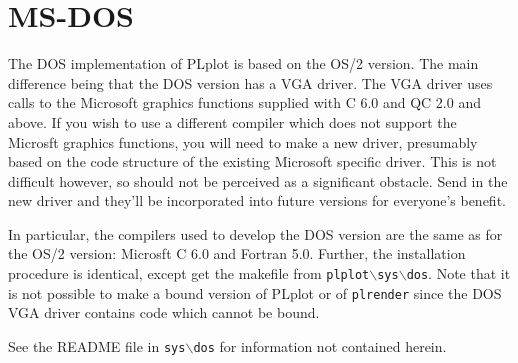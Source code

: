 \section{MS-DOS}

The DOS implementation of PLplot is based on the OS/2 version.  The main 
difference being that the DOS version has a VGA driver.  The VGA driver
uses calls to the Microsoft graphics functions supplied with C 6.0 and
QC 2.0 and above.  If you wish to use a different compiler which does not
support the Microsft graphics functions, you will need to make a new driver,
presumably based on the code structure of the existing Microsoft specific
driver.
This is not difficult however, so should not be perceived as a significant
obstacle.  Send in the new driver and they'll be incorporated into future
versions for everyone's benefit.

In particular, the compilers used to develop the DOS version are the same
as for the OS/2 version: Microsft C 6.0 and Fortran 5.0.  Further, the
installation procedure is identical, except get the makefile from
{\tt plplot$\backslash$sys$\backslash$dos}.  Note that it is not possible
to make a bound version of PLplot or of {\tt plrender} since the DOS VGA
driver contains code which cannot be bound.  

See the README file in {\tt sys$\backslash$dos} for information not
contained herein. 
